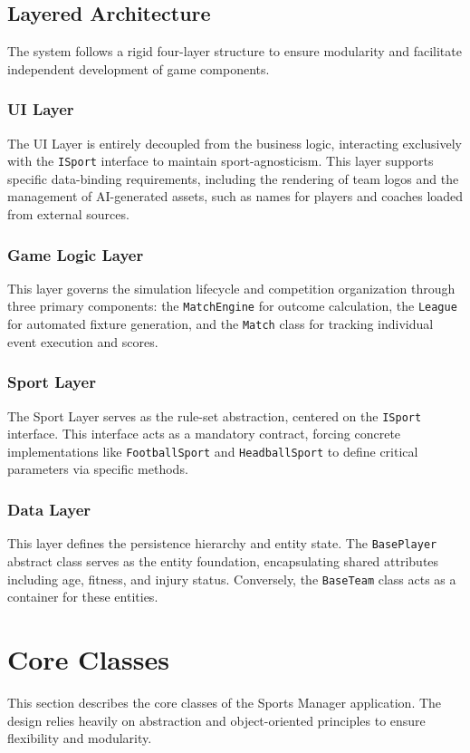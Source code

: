 \documentclass[12pt]{article}
\begin{document}
\subsection{Layered Architecture}
The system follows a rigid four-layer structure to ensure modularity and facilitate independent development of game components.

\subsubsection{UI Layer}
The UI Layer is entirely decoupled from the business logic, interacting exclusively with the \texttt{ISport} interface to maintain sport-agnosticism. This layer supports specific data-binding requirements, including the rendering of team logos and the management of AI-generated assets, such as names for players and coaches loaded from external sources.

\subsubsection{Game Logic Layer}
This layer governs the simulation lifecycle and competition organization through three primary components: the \texttt{MatchEngine} for outcome calculation, the \texttt{League} for automated fixture generation, and the \texttt{Match} class for tracking individual event execution and scores.

\subsubsection{Sport Layer}
The Sport Layer serves as the rule-set abstraction, centered on the \texttt{ISport} interface. This interface acts as a mandatory contract, forcing concrete implementations like \texttt{FootballSport} and \texttt{HeadballSport} to define critical parameters via specific methods.

\subsubsection{Data Layer}
This layer defines the persistence hierarchy and entity state. The \texttt{BasePlayer} abstract class serves as the entity foundation, encapsulating shared attributes including age, fitness, and injury status. Conversely, the \texttt{BaseTeam} class acts as a container for these entities.

\newpage

\section{Core Classes}
This section describes the core classes of the Sports Manager application. The design relies heavily on abstraction and object-oriented principles to ensure flexibility and modularity.
\end{document}
